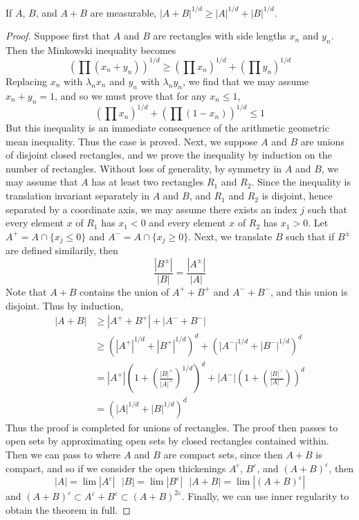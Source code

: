 \begin{lemma}
  If $A$, $B$, and $A+B$ are measurable, $|A + B|^{1/d} \geq |A|^{1/d} + |B|^{1/d}$.
\end{lemma}
\begin{proof}
  Suppose first that $A$ and $B$ are rectangles with side lengths $x_n$ and $y_n$. Then the Minkowski inequality becomes
  \[ \left( \prod (x_n + y_n) \right)^{1/d} \geq \left( \prod x_n \right)^{1/d} + \left( \prod y_n \right)^{1/d} \]
  Replacing $x_n$ with $\lambda_n x_n$ and $y_n$ with $\lambda_n y_n$, we find that we may assume $x_n + y_n = 1$, and so we must prove that for any $x_n \leq 1$,
  \[ \left( \prod x_n \right)^{1/d} + \left( \prod (1 - x_n) \right)^{1/d} \leq 1 \]
  But this inequality is an immediate consequence of the arithmetic geometric mean inequality. Thus the case is proved. Next, we suppose $A$ and $B$ are unions of disjoint closed rectangles, and we prove the inequality by induction on the number of rectangles. Without loss of generality, by symmetry in $A$ and $B$, we may assume that $A$ has at least two rectangles $R_1$ and $R_2$. Since the inequality is translation invariant separately in $A$ and $B$, and $R_1$ and $R_2$ is disjoint, hence separated by a coordinate axis, we may assume there exists an index $j$ such that every element $x$ of $R_1$ has $x_1 < 0$ and every element $x$ of $R_2$ has $x_1 > 0$. Let $A^+ = A \cap \{ x_j \leq 0 \}$ and $A^- = A \cap \{ x_j \geq 0\}$. Next, we translate $B$ such that if $B^{\pm}$ are defined similarily, then
  \[ \frac{|B^{\pm}|}{|B|} = \frac{|A^{\pm}|}{|A|} \]
  Note that $A+B$ contains the union of $A^+ + B^+$ and $A^- + B^-$, and this union is disjoint. Thus by induction,
  \begin{align*}
    |A+B| &\geq |A^+ + B^+| + |A^- + B^-|\\
    &\geq (|A^+|^{1/d} + |B^+|^{1/d})^d + (|A^-|^{1/d} + |B^-|^{1/d})^d\\
    &= |A^+| \left( 1 + \left( \frac{|B|^+}{|A|^+} \right)^{1/d} \right)^d + |A^-| \left( 1 + \left( \frac{|B|^-}{|A|^-} \right) \right)^d\\
    &= (|A|^{1/d} + |B|^{1/d})^d
  \end{align*}
  Thus the proof is completed for unions of rectangles. The proof then passes to open sets by approximating open sets by closed rectangles contained within. Then we can pass to where $A$ and $B$ are compact sets, since then $A+B$ is compact, and so if we consider the open thickenings $A^\varepsilon$, $B^\varepsilon$, and $(A+B)^\varepsilon$, then
  \[ |A| = \lim |A^\varepsilon|\ \ \ |B| = \lim |B^\varepsilon|\ \ \ |A + B| = \lim |(A + B)^\varepsilon| \]
  and $(A+B)^\varepsilon \subset A^\varepsilon + B^\varepsilon \subset (A + B)^{2\varepsilon}$. Finally, we can use inner regularity to obtain the theorem in full.
\end{proof}

